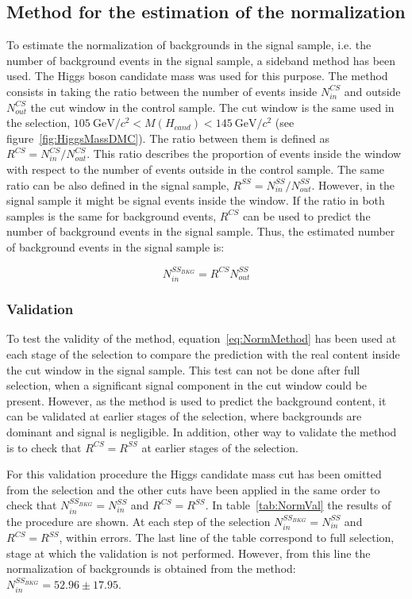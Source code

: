 \subsection{Method for the estimation of the normalization}
\label{sec:bkgnormmet}

To estimate the normalization of backgrounds in the signal sample, i.e. the number of background events in the signal sample, a sideband method has been used. The Higgs boson candidate mass was used for this purpose. The method consists in taking the ratio between the number of events inside $N^{CS}_{in}$ and outside $N^{CS}_{out}$ the cut window in the control sample. The cut window is the same used in the selection, $105~\text{GeV}/c^{2} <M(H_{cand})<145~\text{GeV}/c^{2}$ (see figure~\ref{fig:HiggsMassDMC}). The ratio between them is defined as $R^{CS}=N^{CS}_{in}/N^{CS}_{out}$. This ratio describes the proportion of events inside the window with respect to the number of events outside in the control sample. The same ratio can be also defined in the signal sample, $R^{SS}=N^{SS}_{in}/N^{SS}_{out}$. However, in the signal sample it might be signal events inside the window. If the ratio in both samples is the same for background events, $R^{CS}$ can be used to predict the number of background events in the signal sample. Thus, the estimated number of background events in the signal sample is:

\begin{equation}
  \label{eq:NormMethod}
  N^{SS_{BKG}}_{in}=R^{CS}N^{SS}_{out}
\end{equation}

\subsubsection{Validation}
\label{sec:normval}

To test the validity of the method, equation~\ref{eq:NormMethod} has been used at each stage of the selection to compare the prediction with the real content inside the cut window in the signal sample. This test can not be done after full selection, when a significant signal component in the cut window could be present. However, as the method is used to predict the background content, it can be validated at earlier stages of the selection, where backgrounds are dominant and signal is negligible. In addition, other way to validate the method is to check that $R^{CS}=R^{SS}$ at earlier stages of the selection.

For this validation procedure the Higgs candidate mass cut has been omitted from the selection and the other cuts have been applied in the same order to check that $N^{SS_{BKG}}_{in}=N^{SS}_{in}$ and $R^{CS}=R^{SS}$. In table~\ref{tab:NormVal} the results of the procedure are shown. At each step of the selection $N^{SS_{BKG}}_{in}=N^{SS}_{in}$ and $R^{CS}=R^{SS}$, within errors. The last line of the table correspond to full selection, stage at which the validation is not performed. However, from this line the normalization of backgrounds is obtained from the method: $N^{SS_{BKG}}_{in}=52.96\pm17.95$.

